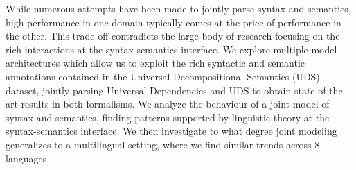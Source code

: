 While numerous attempts have been made to jointly parse syntax and semantics, high performance in one domain typically comes at the price of performance in the other. This trade-off contradicts the large body of research focusing on the rich interactions at the syntax-semantics interface. We explore multiple model architectures which allow us to exploit the rich syntactic and semantic annotations contained in the Universal Decompositional Semantics (UDS) dataset, jointly parsing Universal Dependencies and UDS to obtain state-of-the-art results in both formalisms. We analyze the behaviour of a joint model of syntax and semantics, finding patterns supported by linguistic theory at the syntax-semantics interface. We then investigate to what degree joint modeling generalizes to a multilingual setting, where we find similar trends across 8 languages.